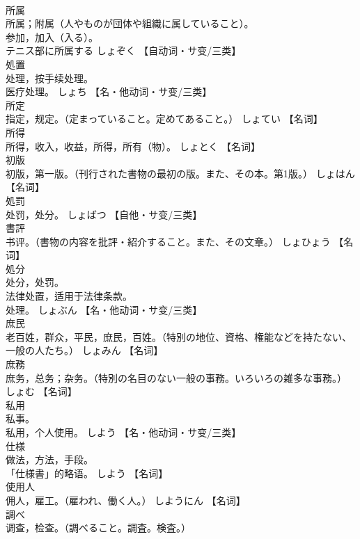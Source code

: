 \documentclass[8pt]{extreport}
\begin{document}
\begin{CJK}{UTF8}{min}
\\	所属	
\\	所属；附属（人やものが団体や組織に属していること）。 
\\	参加，加入（入る）。 
\\	テニス部に所属する	しょぞく		【自动词・サ变/三类】
\\	処置	
\\	处理，按手续处理。 
\\	医疗处理。	しょち		【名・他动词・サ变/三类】
\\	所定	
\\	指定，规定。（定まっていること。定めてあること。）	しょてい		【名词】
\\	所得	
\\	所得，收入，收益，所得，所有（物）。	しょとく		【名词】
\\	初版	
\\	初版，第一版。（刊行された書物の最初の版。また、その本。第1版。）	しょはん		【名词】
\\	処罰	
\\	处罚，处分。	しょばつ		【自他・サ变/三类】
\\	書評	
\\	书评。（書物の内容を批評・紹介すること。また、その文章。）	しょひょう		【名词】
\\	処分	
\\	处分，处罚。 
\\	法律处置，适用于法律条款。 
\\	处理。	しょぶん		【名・他动词・サ变/三类】
\\	庶民	
\\	老百姓，群众，平民，庶民，百姓。（特別の地位、資格、権能などを持たない、一般の人たち。）	しょみん		【名词】
\\	庶務	
\\	庶务，总务；杂务。（特別の名目のない一般の事務。いろいろの雑多な事務。）	しょむ		【名词】
\\	私用	
\\	私事。 
\\	私用，个人使用。	しよう		【名・他动词・サ变/三类】
\\	仕様	
\\	做法，方法，手段。 
\\	「仕様書」的略语。	しよう		【名词】
\\	使用人	
\\	佣人，雇工。（雇われ、働く人。）	しようにん		【名词】
\\	調べ	
\\	调查，检查。（調べること。調査。検査。） 

\end{CJK}
\end{document}
